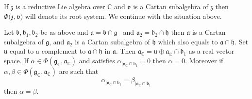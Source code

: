 \documentclass{amse-new}
\numberwithin{equation}{section} %
\begin{document}
If $\mathfrak{z}$ is a reductive Lie algebra over $\mathbb{C}$ and
$\mathfrak{v}$ is a Cartan subalgebra of $\mathfrak{z}$ then $\Phi
(\mathfrak{z,v)}$ will denote its root system. We continue with the situation above.

\begin{proposition}
\label{prop:13} Let $\mathfrak{b},\mathfrak{b}_{1}%
,\mathfrak{b}_{2}$ be as above and $\mathfrak{a=\mathfrak{b\cap\mathfrak{g}}}$
\ and $\mathfrak{a}_{2}=\mathfrak{b}_{2}\cap\mathfrak{h}$ then $\mathfrak{a}$
is a Cartan subalgebra of $\mathfrak{g}$, and $\mathfrak{a}_{2}$ is a Cartan
subalgebra of $\mathfrak{h}$ which  also equals to $\mathfrak{a\cap\mathfrak{h}}$.
Set $\mathfrak{u}$ equal to a complement to $\mathfrak{a\cap\mathfrak{h}}$ in
$\mathfrak{a.}$ Then $\mathfrak{a}_{\mathbb{C}}=\mathfrak{u\oplus
a}_{\mathbb{C}}\cap\mathfrak{b}_{1}$ as a real vector space. If $\alpha\in
\Phi(\mathfrak{g}_{\mathbb{C}},\mathfrak{a}_{\mathbb{C}})$ and satisfies $\alpha
_{|\mathfrak{a}_{\mathbb{C}}\cap\mathfrak{b}_{1}}=0$ then $\alpha=0$. Moreover  if
$\alpha,\beta\in\Phi(\mathfrak{g}_{\mathbb{C}},\mathfrak{a}_{\mathbb{C}})$ are
such that
\[
\alpha_{|\mathfrak{a}_{\mathbb{C}}\cap\mathfrak{b}_{1}}=\beta_{|\mathfrak{a}%
_{\mathbb{C}}\cap\mathfrak{b}_{1}}%
\]
then $\alpha=\beta$.
\end{proposition}
\end{document}
